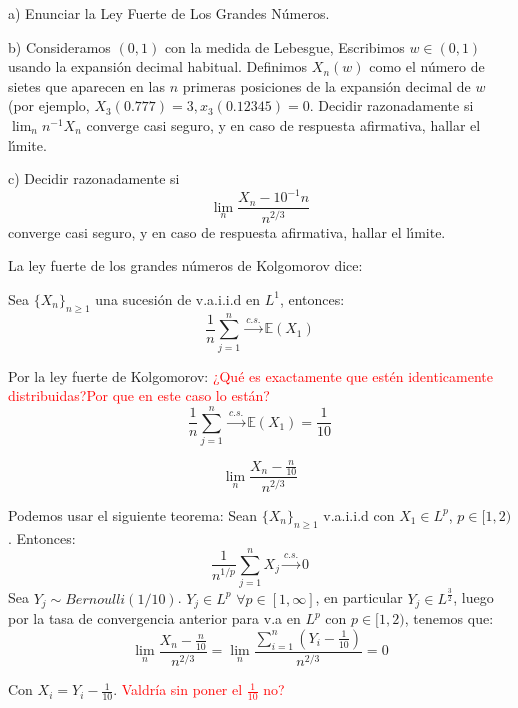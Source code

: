 
\begin{problem}[3]a) Enunciar la Ley Fuerte de Los Grandes N\'umeros.

b) Consideramos $(0,1)$ con la medida de Lebesgue, Escribimos $w\in (0,1)$ usando
la expansi\'on decimal habitual. Definimos $X_n(w)$ como el n\'umero de sietes que aparecen
en las $n$ primeras posiciones de la expansi\'on decimal de $w$ (por ejemplo, $X_3(0.777) = 3,
 x_3(0.12345) = 0$.  Decidir razonadamente si $\lim_n n^{-1}X_n$ converge casi seguro, y
 en caso de respuesta afirmativa, hallar el l\'{\i}mite.
 
 c) Decidir razonadamente si 
 $$
 \lim_n \frac{X_n - 10^{-1}n}{n^{2/3}}
 $$ 
 converge casi seguro, y
 en caso de respuesta afirmativa, hallar el l\'{\i}mite.


\solution

\spart
La ley fuerte de los grandes números de Kolgomorov dice:

Sea $\{X_n\}_{n \geq 1}$ una sucesión de v.a.i.i.d en $L^1$, entonces:
\[
\frac{1}{n}\sum_{j=1}^{n} \stackrel{c.s.}{\rightarrow} \mathbb{E}(X_1)
\]

\spart
Por la ley fuerte de Kolgomorov: \textcolor{red}{¿Qué es exactamente que estén identicamente distribuidas?Por que en este caso lo están?}
\[
\frac{1}{n}\sum_{j=1}^{n} \stackrel{c.s.}{\rightarrow} \mathbb{E}(X_1) = \frac{1}{10}
\]

\spart

\[
\lim_n \frac{X_n-\frac{n}{10}}{n^{2/3}}
\]

Podemos usar el siguiente teorema:
Sean $\{X_n\}_{n\geq 1}$ v.a.i.i.d con $X_1 \in L^p$, $p \in [1,2)$. Entonces:
\[
\frac{1}{n^{1/p}}\sum_{j=1}^{n}X_j \stackrel{c.s.}{\rightarrow} 0
\]
Sea $Y_j \sim Bernoulli(1/10)$. $Y_j \in L^p$ $\forall p \in [1, \infty]$, en particular $Y_j \in L^{\frac{3}{2}}$, luego por la tasa de convergencia anterior para v.a en $L^p$ con $p \in [1,2)$, tenemos que:
\[
\lim_n \frac{X_n-\frac{n}{10}}{n^{2/3}} = \lim_n \frac{\sum_{i=1}^{n} (Y_i -\frac{1}{10})}{n^{2/3}} = 0
\]

Con $X_i = Y_i - \frac{1}{10}$. \textcolor{red}{Valdría sin poner el $\frac{1}{10}$ no?}

\end{problem}


